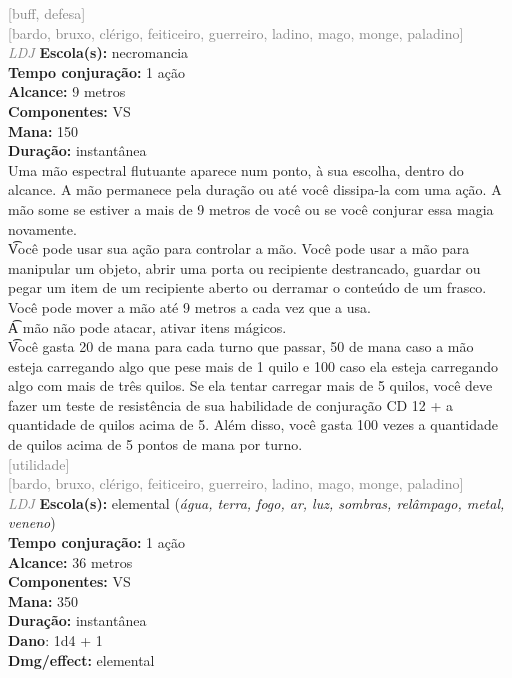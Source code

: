 \documentclass{RPG_Adventure}[2021/10/20]
\begin{document}
{\scriptsize \textcolor{gray}{[buff, defesa]\\}}
{\scriptsize \textcolor{gray}{[bardo, bruxo, clérigo, feiticeiro, guerreiro, ladino, mago, monge, paladino]\\}}
{\tiny \textcolor{gray}{\textit{LDJ}}}
{\small \t \textbf{Escola(s):} necromancia\\\t \textbf{Tempo conjuração:} 1 ação\\\t \textbf{Alcance:} 9 metros\\\t \textbf{Componentes:} VS\\\t \textbf{Mana:} 150\\\t \textbf{Duração:} instantânea\\}
{\normalsize Uma mão espectral flutuante aparece num ponto, à sua escolha, dentro do alcance. A mão permanece pela duração ou até você dissipa-la com uma ação. A mão some se estiver a mais de 9 metros de você ou se você conjurar essa magia novamente.\\\t Você pode usar sua ação para controlar a mão. Você pode usar a mão para manipular um objeto, abrir uma porta ou recipiente destrancado, guardar ou pegar um item de um recipiente aberto ou derramar o conteúdo de um frasco. Você pode mover a mão até 9 metros a cada vez que a usa.\\\t A mão não pode atacar, ativar itens mágicos.\\\t Você gasta 20 de mana para cada turno que passar, 50 de mana caso a mão esteja carregando algo que pese mais de 1 quilo e 100 caso ela esteja carregando algo com mais de três quilos. Se ela tentar carregar mais de 5 quilos, você deve fazer um teste de resistência de sua habilidade de conjuração CD 12 + a quantidade de quilos acima de 5. Além disso, você gasta 100 vezes a quantidade de quilos acima de 5 pontos de mana por turno.\\}
{\scriptsize \textcolor{gray}{[utilidade]\\}}
{\scriptsize \textcolor{gray}{[bardo, bruxo, clérigo, feiticeiro, guerreiro, ladino, mago, monge, paladino]\\}}
{\tiny \textcolor{gray}{\textit{LDJ}}}
{\small \t \textbf{Escola(s):} elemental (\textit{água, terra, fogo, ar, luz, sombras, relâmpago, metal, veneno})\\\t \textbf{Tempo conjuração:} 1 ação\\\t \textbf{Alcance:} 36 metros\\\t \textbf{Componentes:} VS\\\t \textbf{Mana:} 350\\\t \textbf{Duração:} instantânea\\\t \textbf{Dano}: 1d4 + 1\\\t \textbf{Dmg/effect:} elemental\\}
\end{document}
